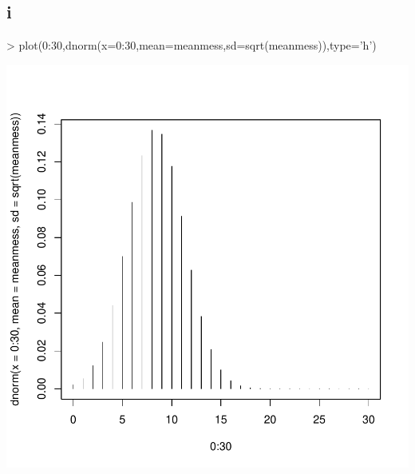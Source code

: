 \subsection{i}
\begin{Schunk}
\begin{Sinput}
> plot(0:30,dnorm(x=0:30,mean=meanmess,sd=sqrt(meanmess)),type='h')
\end{Sinput}
\end{Schunk}
\includegraphics{sw10_1-010}

